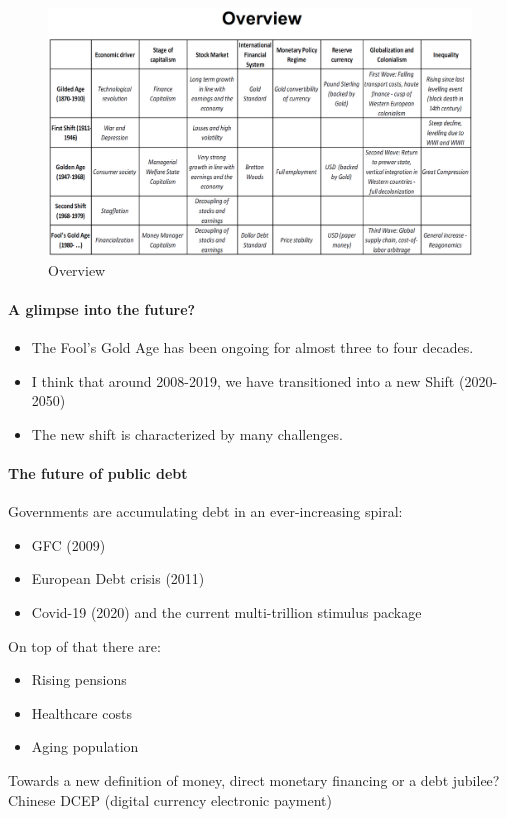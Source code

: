 \begin{figure}[h]
    \centering
    \includegraphics[width=\textwidth]{Pictures/6_Overview.png}
    \caption{Overview}
\end{figure}

\paragraph{A glimpse into the future?}
\begin{itemize}
    \item The Fool's Gold Age has been ongoing for almost three to four
        decades.
    \item I think that around 2008-2019, we have transitioned into a new
        Shift (2020-2050)
    \item The new shift is characterized by many challenges.
\end{itemize}

\paragraph{The future of public debt}
Governments are accumulating debt in an ever-increasing spiral:
\begin{itemize}
    \item GFC (2009)
    \item European Debt crisis (2011)
    \item Covid-19 (2020) and the current multi-trillion stimulus package
\end{itemize}
On top of that there are:
\begin{itemize}
    \item Rising pensions
    \item Healthcare costs
    \item Aging population
\end{itemize}
Towards a new definition of money, direct monetary financing or a debt
jubilee? Chinese DCEP (digital currency electronic payment)

